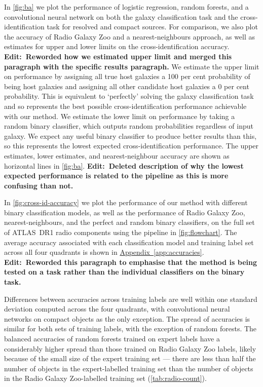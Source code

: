 \documentclass[fleqn,usenatbib,usedcolumn]{mnras}
\newcommand{\edit}[1]{{\bf Edit:~{#1}}}
\newcommand{\aref}[1]{\hyperref[#1]{Appendix~\ref{#1}}}
\begin{document}
    In \autoref{fig:ba} we plot the performance of logistic regression, random forests, and a convolutional neural network on both the galaxy
    classification task and the cross-identification task for resolved and compact sources. For comparison, we also plot the accuracy of Radio Galaxy
    Zoo and a nearest-neighbours approach, as well as estimates for upper and lower limits on the cross-identification accuracy. \edit{Reworded how we estimated upper limit and merged this paragraph with the specific results paragraph.} We estimate the upper limit on performance by assigning all true host galaxies a 100 per cent probability of being host galaxies and assigning all other candidate host galaxies a 0 per cent probability. This is equivalent to `perfectly' solving the galaxy classification task and so represents the best possible cross-identification performance achievable with our method. We estimate the lower limit on performance by taking a random binary classifier, which outputs random probabilities regardless of input galaxy. We expect any useful binary classifier to produce better results than this, so this represents the lowest expected cross-identification performance. The upper estimates, lower estimates, and nearest-neighbour accuracy are shown as horizontal lines in \autoref{fig:ba}. \edit{Deleted description of why the lowest expected performance is related to the pipeline as this is more confusing than not.}

    In \autoref{fig:cross-id-accuracy} we plot the performance of our method with different binary classification models, as well as the performance of Radio Galaxy Zoo, nearest-neighbours, and the perfect and random binary classifiers, on the full set of ATLAS~DR1 radio components using the pipeline in \autoref{fig:flowchart}. The average accuracy associated with each classification model and training label set across all four quadrants is shown in \aref{app:accuracies}. \edit{Reworded this paragraph to emphasise that the method is being tested on a task rather than the individual classifiers on the binary task.}

    Differences between accuracies across training labels are well within one standard deviation computed across the four quadrants, with convolutional neural networks on compact objects as the only exception. The spread of accuracies is similar for both sets of training labels, with the exception of random forests. The balanced accuracies of random forests trained on expert labels have a considerably higher spread than those trained on Radio Galaxy Zoo labels, likely because of the small size of the expert training set --- there are less than half the number of objects in the expert-labelled training set than the number of objects in the Radio Galaxy Zoo-labelled training set (\autoref{tab:radio-count}).
\end{document}
